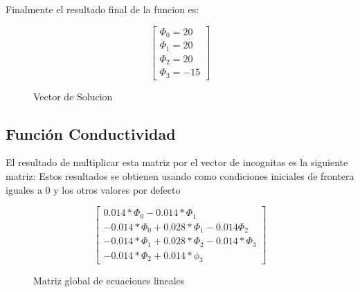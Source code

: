 \documentclass{article}
\begin{document}
Finalmente el resultado final de la funcion es:

\begin{figure}[!h]
    
    \[
        \begin{bmatrix}
            {\Phi_0 = 20}\\
            {\Phi_1 = 20}\\
            {\Phi_2 = 20}\\
            {\Phi_3 = -15}
        \end{bmatrix}
    \]
    \caption{Vector de Solucion}
\end{figure}

\subsection{Función Conductividad}

El resultado de multiplicar esta matriz por el vector de incognitas es la siguiente matriz:
Estos resultados se obtienen usando como condiciones iniciales de frontera iguales a 0 y los otros valores por defecto
\begin{figure}[!h]
    \[
        \begin{bmatrix}
            {0.014*\Phi_0 - 0.014*\Phi_1}\\
            {-0.014*\Phi_0 + 0.028*\Phi_1-0.014\Phi_2}\\
            {-0.014*\Phi_1 + 0.028*\Phi_2 - 0.014*\Phi_3}\\
            {-0.014*\Phi_2 + 0.014*\phi_3}
        \end{bmatrix}
    \]
    \caption{Matriz global de ecuaciones lineales}
    \end{figure}
\end{document}
